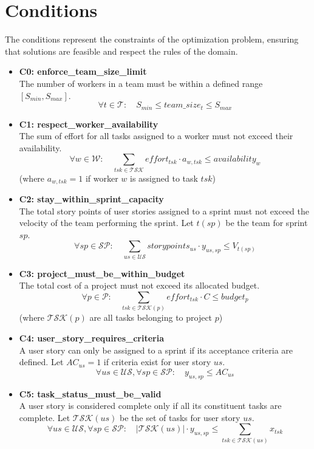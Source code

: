 \documentclass[11pt]{article}
\begin{document}
\section{Conditions}
The conditions represent the constraints of the optimization problem, ensuring that solutions are feasible and respect the rules of the domain.

\begin{itemize}
    \item \textbf{C0: enforce\_team\_size\_limit} \\
    The number of workers in a team must be within a defined range $[S_{min}, S_{max}]$.
    $$ \forall t \in \mathcal{T}: \quad S_{min} \le team\_size_t \le S_{max} $$

    \item \textbf{C1: respect\_worker\_availability} \\
    The sum of effort for all tasks assigned to a worker must not exceed their availability.
    $$ \forall w \in \mathcal{W}: \quad \sum_{tsk \in \mathcal{TSK}} effort_{tsk} \cdot a_{w, tsk} \le availability_w $$
    (where $a_{w, tsk}=1$ if worker $w$ is assigned to task $tsk$)

    \item \textbf{C2: stay\_within\_sprint\_capacity} \\
    The total story points of user stories assigned to a sprint must not exceed the velocity of the team performing the sprint. Let $t(sp)$ be the team for sprint $sp$.
    $$ \forall sp \in \mathcal{SP}: \quad \sum_{us \in \mathcal{US}} storypoints_{us} \cdot y_{us, sp} \le V_{t(sp)} $$
    
    \item \textbf{C3: project\_must\_be\_within\_budget} \\
    The total cost of a project must not exceed its allocated budget.
    $$ \forall p \in \mathcal{P}: \quad \sum_{tsk \in \mathcal{TSK}(p)} effort_{tsk} \cdot C \le budget_p $$
    (where $\mathcal{TSK}(p)$ are all tasks belonging to project $p$)
    
    \item \textbf{C4: user\_story\_requires\_criteria} \\
    A user story can only be assigned to a sprint if its acceptance criteria are defined. Let $AC_{us}=1$ if criteria exist for user story $us$.
    $$ \forall us \in \mathcal{US}, \forall sp \in \mathcal{SP}: \quad y_{us, sp} \le AC_{us} $$
    
    \item \textbf{C5: task\_status\_must\_be\_valid} \\
    A user story is considered complete only if all its constituent tasks are complete. Let $\mathcal{TSK}(us)$ be the set of tasks for user story $us$.
    $$ \forall us \in \mathcal{US}, \forall sp \in \mathcal{SP}: \quad |\mathcal{TSK}(us)| \cdot y_{us, sp} \le \sum_{tsk \in \mathcal{TSK}(us)} x_{tsk} $$


\end{itemize}
\end{document}
